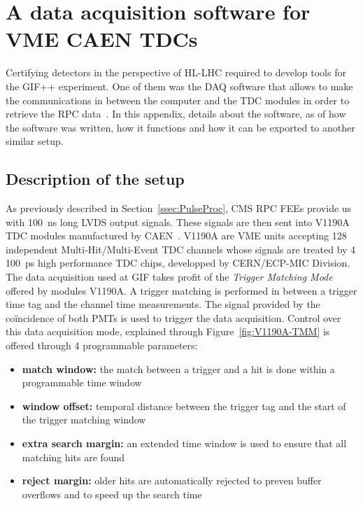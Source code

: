 \graphicspath{{chapt_dutch/}{intro/}{chapt2/}{chapt3/}{chapt4/}{chapt5/}{chapt6/}{chapt7/}}

\renewcommand\evenpagerightmark{{\scshape\small Appendix A}}
\renewcommand\oddpageleftmark{{\scshape\small A data acquisition software for VME CAEN TDCs}}

\renewcommand{\bibname}{References}

\hyphenation{}

\chapter[A data acquisition software for VME CAEN TDCs]%
{A data acquisition software for VME CAEN TDCs}
\label{app1}

Certifying detectors in the perspective of HL-LHC required to develop tools for the GIF++ experiment. One of them was the \acf{DAQ} software that allows to make the communications in between the computer and the TDC modules in order to retrieve the RPC data~\cite{GIFDAQ}. In this appendix, details about the software, as of how the software was written, how it functions and how it can be exported to another similar setup.

\section{Description of the setup}

	As previously described in Section~\ref{ssec:PulseProc}, CMS RPC FEEs provide us with \SI{100}{ns} long LVDS output signals. These signals are then sent into V1190A \acf{TDC} modules manufactured by CAEN~\cite{V1190AMUT}. V1190A are VME units accepting 128 independent Multi-Hit/Multi-Event TDC channels whose signals are treated by 4 \SI{100}{ps} high performance TDC chips, developped by CERN/ECP-MIC Division. The data acquisition used at GIF takes profit of the \textit{Trigger Matching Mode} offered by modules V1190A. A trigger matching is performed in between a trigger time tag and the channel time measurements. The signal provided by the coïncidence of both PMTs is used to trigger the data acquisition. Control over this data acquisition mode, explained through Figure~\ref{fig:V1190A-TMM} is offered through 4 programmable parameters:
        
	\begin{itemize}
		\item \textbf{match window:} the match between a trigger and a hit is done within a programmable time window
		\item \textbf{window offset:} temporal distance between the trigger tag and the start of the trigger matching window
		\item \textbf{extra search margin:} an extended time window is used to ensure that all matching hits are found
		\item \textbf{reject margin:} older hits are automatically rejected to preven buffer overflows and to speed up the search time
	\end{itemize}
    
